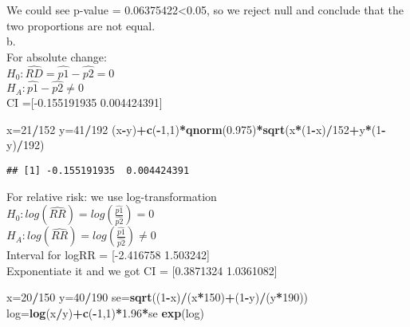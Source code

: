 \documentclass[]{article}
\newenvironment{Shaded}{\begin{snugshade}}{\end{snugshade}}
\newcommand{\KeywordTok}[1]{\textcolor[rgb]{0.13,0.29,0.53}{\textbf{#1}}}
\newcommand{\DecValTok}[1]{\textcolor[rgb]{0.00,0.00,0.81}{#1}}
\newcommand{\FloatTok}[1]{\textcolor[rgb]{0.00,0.00,0.81}{#1}}
\newcommand{\OperatorTok}[1]{\textcolor[rgb]{0.81,0.36,0.00}{\textbf{#1}}}
\newcommand{\NormalTok}[1]{#1}
\begin{document}
We could see p-value = 0.06375422\textless{}0.05, so we reject null and
conclude that the two proportions are not equal.\\
b.\\
For absolute change:\\
\(H_0 : \hat{RD} = \hat{p1} - \hat{p2} = 0\)\\
\(H_A : \hat{p1} - \hat{p2} \neq0\)\\
CI ={[}-0.155191935 0.004424391{]}

\begin{Shaded}
\begin{Highlighting}[]
\NormalTok{x=}\DecValTok{21}\OperatorTok{/}\DecValTok{152}
\NormalTok{y=}\DecValTok{41}\OperatorTok{/}\DecValTok{192}
\NormalTok{(x}\OperatorTok{-}\NormalTok{y)}\OperatorTok{+}\KeywordTok{c}\NormalTok{(}\OperatorTok{-}\DecValTok{1}\NormalTok{,}\DecValTok{1}\NormalTok{)}\OperatorTok{*}\KeywordTok{qnorm}\NormalTok{(}\FloatTok{0.975}\NormalTok{)}\OperatorTok{*}\KeywordTok{sqrt}\NormalTok{(x}\OperatorTok{*}\NormalTok{(}\DecValTok{1}\OperatorTok{-}\NormalTok{x)}\OperatorTok{/}\DecValTok{152}\OperatorTok{+}\NormalTok{y}\OperatorTok{*}\NormalTok{(}\DecValTok{1}\OperatorTok{-}\NormalTok{y)}\OperatorTok{/}\DecValTok{192}\NormalTok{)}
\end{Highlighting}
\end{Shaded}

\begin{verbatim}
## [1] -0.155191935  0.004424391
\end{verbatim}

For relative risk: we use log-transformation\\
\(H_0 : log(\hat{RR}) = log(\frac{\hat{p1}}{\hat{p2}}) = 0\)\\
\(H_A : log(\hat{RR}) = log(\frac{\hat{p1}}{\hat{p2}}) \neq 0\)\\
Interval for logRR = {[}-2.416758 1.503242{]}\\
Exponentiate it and we got CI = {[}0.3871324 1.0361082{]}

\begin{Shaded}
\begin{Highlighting}[]
\NormalTok{x=}\DecValTok{20}\OperatorTok{/}\DecValTok{150}
\NormalTok{y=}\DecValTok{40}\OperatorTok{/}\DecValTok{190}
\NormalTok{se=}\KeywordTok{sqrt}\NormalTok{((}\DecValTok{1}\OperatorTok{-}\NormalTok{x)}\OperatorTok{/}\NormalTok{(x}\OperatorTok{*}\DecValTok{150}\NormalTok{)}\OperatorTok{+}\NormalTok{(}\DecValTok{1}\OperatorTok{-}\NormalTok{y)}\OperatorTok{/}\NormalTok{(y}\OperatorTok{*}\DecValTok{190}\NormalTok{))}
\NormalTok{log=}\KeywordTok{log}\NormalTok{(x}\OperatorTok{/}\NormalTok{y)}\OperatorTok{+}\KeywordTok{c}\NormalTok{(}\OperatorTok{-}\DecValTok{1}\NormalTok{,}\DecValTok{1}\NormalTok{)}\OperatorTok{*}\FloatTok{1.96}\OperatorTok{*}\NormalTok{se}
\KeywordTok{exp}\NormalTok{(log)}
\end{Highlighting}
\end{Shaded}
\end{document}
